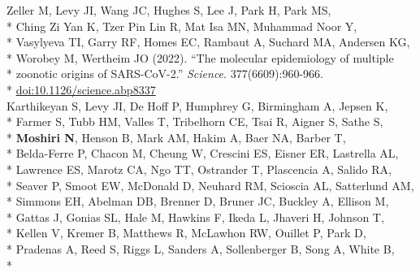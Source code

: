 \documentclass[margin,line]{res}
\begin{document}
\begin{resume}
\hspace*{9mm} Zeller M, Levy JI, Wang JC, Hughes S, Lee J, Park H, Park MS,\\*
\hspace*{9mm} Ching Zi Yan K, Tzer Pin Lin R, Mat Isa MN, Muhammad Noor Y,\\*
\hspace*{9mm} Vasylyeva TI, Garry RF, Homes EC, Rambaut A, Suchard MA, Andersen KG,\\*
\hspace*{9mm} Worobey M, Wertheim JO (2022). ``The molecular epidemiology of multiple\\*
\hspace*{9mm} zoonotic origins of SARS-CoV-2.'' \textit{Science}. 377(6609):960-966.\\*\vspace{2mm}
\hspace*{8mm} \href{https://doi.org/10.1126/science.abp8337}{doi:10.1126/science.abp8337}\\
\hspace*{4mm} Karthikeyan S, Levy JI, De Hoff P, Humphrey G, Birmingham A, Jepsen K,\\*
\hspace*{9mm} Farmer S, Tubb HM, Valles T, Tribelhorn CE, Tsai R, Aigner S, Sathe S,\\*
\hspace*{9mm} \textbf{Moshiri N}, Henson B, Mark AM, Hakim A, Baer NA, Barber T,\\*
\hspace*{9mm} Belda-Ferre P, Chacon M, Cheung W, Crescini ES, Eisner ER, Lastrella AL,\\*
\hspace*{9mm} Lawrence ES, Marotz CA, Ngo TT, Ostrander T, Plascencia A, Salido RA,\\*
\hspace*{9mm} Seaver P, Smoot EW, McDonald D, Neuhard RM, Scioscia AL, Satterlund AM,\\*
\hspace*{9mm} Simmons EH, Abelman DB, Brenner D, Bruner JC, Buckley A, Ellison M,\\*
\hspace*{9mm} Gattas J, Gonias SL, Hale M, Hawkins F, Ikeda L, Jhaveri H, Johnson T,\\*
\hspace*{9mm} Kellen V, Kremer B, Matthews R, McLawhon RW, Ouillet P, Park D,\\*
\hspace*{9mm} Pradenas A, Reed S, Riggs L, Sanders A, Sollenberger B, Song A, White B,\\*

\end{resume}
\end{document}
